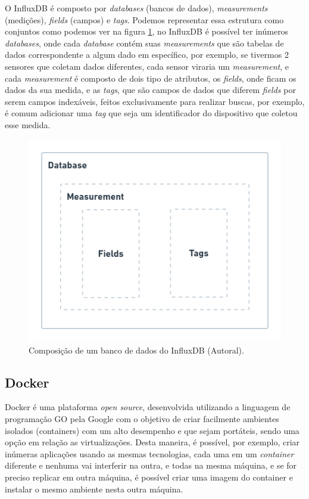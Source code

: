 O InfluxDB é composto por \textit{databases} (bancos de dados), \textit{measurements} (medições), \textit{fields} (campos) e \textit{tags}. Podemos representar essa estrutura como conjuntos como podemos ver na figura \ref{fig:influxdb-struct}, no InfluxDB é possível ter inúmeros \textit{databases}, onde cada \textit{database} contém suas \textit{measurements} que são tabelas de dados correspondente a algum dado em específico, por exemplo, se tivermos 2 sensores que coletam dados diferentes, cada sensor viraria um \textit{measurement}, e cada \textit{measurement} é composto  de dois tipo de atributos, os \textit{fields}, onde ficam os dados da sua medida, e as \textit{tags}, que são campos de dados que diferem \textit{fields} por serem campos indexáveis, feitos exclusivamente para realizar buscas, por exemplo, é comum adicionar uma \textit{tag} que seja um identificador do dispositivo que coletou esse medida.

\begin{figure}[H]
  \centering
  \includegraphics[width=.80\textwidth]{assets/influxdb-struct.png} 
  \caption{Composição de um banco de dados do InfluxDB (Autoral).}
  \label{fig:influxdb-struct} 
\end{figure}

\subsection{Docker}
\label{fund:docker}
Docker é uma plataforma \textit{open source}, desenvolvida utilizando a linguagem de programação GO pela Google com o objetivo de criar facilmente  ambientes isolados (containers) com um alto desempenho e que sejam portáteis, sendo uma opção em relação as virtualizações. Desta maneira, é possível, por exemplo, criar inúmeras aplicações usando as mesmas tecnologias, cada uma em um \textit{container} diferente e nenhuma vai interferir na outra, e todas na mesma máquina, e se for preciso replicar em outra máquina, é possível criar uma imagem do container e instalar o mesmo ambiente nesta outra máquina.

